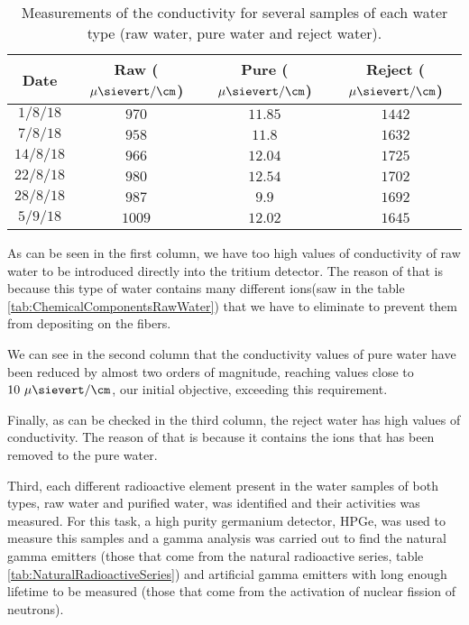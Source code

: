 \begin{table}[htbp]
\begin{center}
\begin{tabular}{|c|c|c|c|}
\hline
Date & Raw ($\mu\sievert/\cm$) & Pure ($\mu\sievert/\cm$) & Reject ($\mu\sievert/\cm$) \\
\hline \hline \hline
$1/8/18$ & $970$ & $11.85$ & $1442$ \\ \hline
$7/8/18$ & $958$ & $11.8$ & $1632$ \\ \hline
$14/8/18$ & $966$ & $12.04$ & $1725$ \\ \hline
$22/8/18$ & $980$ & $12.54$ & $1702$ \\ \hline
$28/8/18$ & $987$ & $9.9$ & $1692$ \\ \hline
$5/9/18$ & $1009$ & $12.02$ & $1645$ \\ \hline
\end{tabular}
\caption{Measurements of the conductivity for several samples of each water type (raw water, pure water and reject water).}
\label{tab:ConductivityValues}
\end{center}
\end{table}	

As can be seen in the first column, we have too high values of conductivity of raw water to be introduced directly into the tritium detector. The reason of that is because this type of water contains many different ions(saw in the table \ref{tab:ChemicalComponentsRawWater}) that we have to eliminate to prevent them from depositing on the fibers. 

We can see in the second column that the conductivity values of pure water have been reduced by almost two orders of magnitude, reaching values close to $10~\mu\sievert/\cm$, our initial objective, exceeding this requirement.

Finally, as can be checked in the third column, the reject water has high values of conductivity. The reason of that is because it contains the ions that has been removed to the pure water.

Third, each different radioactive element present in the water samples of both types, raw water and purified water, was identified and their activities was measured. For this task, a high purity germanium detector, HPGe, was used to measure this samples and a gamma analysis was carried out to find the natural gamma emitters (those that come from the natural radioactive series, table \ref{tab:NaturalRadioactiveSeries}) and artificial gamma emitters with long enough lifetime to be measured (those that come from the activation of nuclear fission of neutrons).

